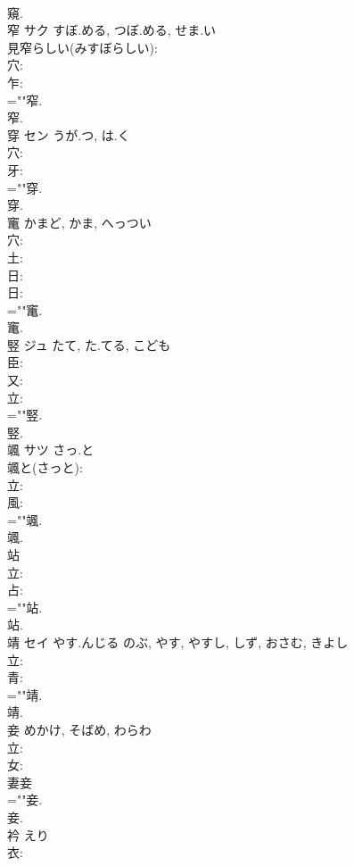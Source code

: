\documentclass[8pt]{extreport}
\begin{document}
\begin{CJK}{UTF8}{min}
\\	窺.
\\	窄	サク	すぼ.める, つぼ.める, せま.い		
\\	見窄らしい(みすぼらしい): 
\\	穴: 
\\	乍: 
\\	=""窄.
\\	窄.
\\	穿	セン	うが.つ, は.く		
\\	穴: 
\\	牙: 
\\	=""穿.
\\	穿.
\\	竃		かまど, かま, へっつい				
\\	穴: 
\\	土: 
\\	日: 
\\	日: 
\\	=""竃.
\\	竃.
\\	竪	ジュ	たて, た.てる, こども		
\\	臣: 
\\	又: 
\\	立: 
\\	=""竪.
\\	竪.
\\	颯	サツ	さっ.と		
\\	颯と(さっと): 
\\	立: 
\\	風: 
\\	=""颯.
\\	颯.
\\	站						
\\	立: 
\\	占: 
\\	=""站.
\\	站.
\\	靖	セイ	やす.んじる	のぶ, やす, やすし, しず, おさむ, きよし	
\\	立: 
\\	青: 
\\	=""靖.
\\	靖.
\\	妾		めかけ, そばめ, わらわ				
\\	立: 
\\	女: 
\\	妻妾 
\\	=""妾.
\\	妾.
\\	衿		えり				
\\	衣: 

\end{CJK}
\end{document}
